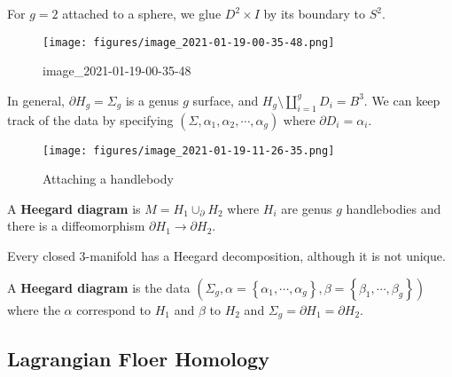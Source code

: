\begin{example}[Attaching $g=2$ handles to a sphere]

For \(g=2\) attached to a sphere, we glue \(D^2 \times I\) by its
boundary to \(S^2\).

\begin{figure}
\centering
\texttt{[image: figures/image\_2021-01-19-00-35-48.png]}
\caption{image\_2021-01-19-00-35-48}
\end{figure}

In general, \({{\partial}}H_g = \Sigma_g\) is a genus \(g\) surface, and
\(H_g \setminus{\coprod}_{i=1}^g D_i = B^3\). We can keep track of the
data by specifying \((\Sigma, \alpha_1, \alpha_2, \cdots, \alpha_g)\)
where \({{\partial}}D_i = \alpha_i\).

\begin{figure}
\centering
\texttt{[image: figures/image\_2021-01-19-11-26-35.png]}
\caption{Attaching a handlebody}
\end{figure}

\end{example}

\begin{definition}

A \textbf{Heegard diagram} is \(M = H_1 \cup_{{\partial}}H_2\) where
\(H_i\) are genus \(g\) handlebodies and there is a diffeomorphism
\({{\partial}}H_1 \to {{\partial}}H_2\).

\end{definition}

\begin{theorem}[?]

Every closed 3-manifold has a Heegard decomposition, although it is not
unique.

\end{theorem}

\begin{definition}

A \textbf{Heegard diagram} is the data
\((\Sigma_g, \alpha = \left\{{ \alpha_1, \cdots, \alpha_g}\right\}, \beta = \left\{{ \beta_1, \cdots, \beta_g}\right\})\)
where the \(\alpha\) correspond to \(H_1\) and \(\beta\) to \(H_2\) and
\(\Sigma_g = {{\partial}}H_1 = {{\partial}}H_2\).

\end{definition}

\hypertarget{lagrangian-floer-homology}{%
\subsection{Lagrangian Floer Homology}\label{lagrangian-floer-homology}}

